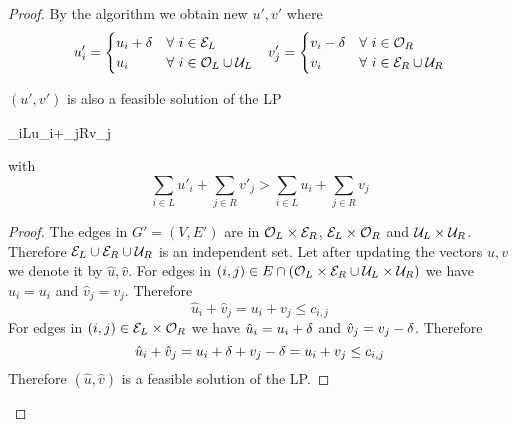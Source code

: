 \documentclass[twoside]{article}
\begin{document}
\begin{proof}
	By the algorithm we obtain new $u',v'$ where \begin{align*}
		u'_i=\begin{cases}
			u_i+\delta & \forall\ i\in \mathcal{E}_L\\
			u_i & \forall\ i\in \mathcal{O}_L\cup \mathcal{U}_L
		\end{cases}  && v'_j=\begin{cases}
			v_i-\delta & \forall\ i\in \mathcal{O}_R\\
			v_i & \forall\ i\in \mathcal{E}_R\cup \mathcal{U}_R
		\end{cases} 
	\end{align*}
	\begin{claimwidth}
		\begin{claim}{}{}
			$(u',v')$ is also a feasible solution of the LP \begin{maxi*}{}{\sum_{i\in L}u_i+\sum_{j\in R}v_j}{}{}
			\end{maxi*} with $$\sum\limits_{i\in L}u'_i+\sum\limits_{j\in R}v'_j> \sum\limits_{i\in L}u_i+\sum\limits_{j\in R}v_j$$
		\end{claim}
		\begin{proof}
			The edges in $G'=(V,E')$ are in $\mathcal{O}_L\times \mathcal{E}_R$, $\mathcal{E}_L\times \mathcal{O}_R$ and $\mathcal{U}_L\times \mathcal{U}_R$. Therefore $\mathcal{E}_L\cup \mathcal{E}_R\cup \mathcal{U}_R$ is an independent set. Let after updating the vectors $u,v$ we denote it by $\hat{u},\hat{v}$. For edges in $(i,j)\in E\cap (\mathcal{O}_L\times\mathcal{E}_R \cup   \mathcal{U}_L\times \mathcal{U}_R)$ we have $\hat{u}_i=u_i$ and $\hat{v}_j=v_j$. Therefore  $$\hat{u}_i+\hat{v}_j=u_i+v_j\leq c_{i,j}$$For edges in $(i,j)\in  \mathcal{E}_L\times \mathcal{O}_R$ we have $\hat{u}_i=u_i+\delta$ and $\hat{v}_j=v_j-\delta$. Therefore  $$\hat{u}_i+\hat{v}_j=u_i+\delta+v_j-\delta=u_i+v_j\leq c_{i,j}$$Therefore $(\hat{u},\hat{v})$ is a feasible solution of the LP. 
			

\end{proof}
\end{claimwidth}
\end{proof}
\end{document}
